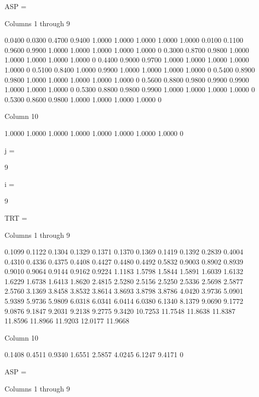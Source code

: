 ASP =

  Columns 1 through 9

    0.0400    0.0300    0.4700    0.9400    1.0000    1.0000    1.0000    1.0000    1.0000
    0.0100    0.1100    0.9600    0.9900    1.0000    1.0000    1.0000    1.0000    1.0000
         0    0.3000    0.8700    0.9800    1.0000    1.0000    1.0000    1.0000    1.0000
         0    0.4400    0.9000    0.9700    1.0000    1.0000    1.0000    1.0000    1.0000
         0    0.5100    0.8400    1.0000    0.9900    1.0000    1.0000    1.0000    1.0000
         0    0.5400    0.8900    0.9800    1.0000    1.0000    1.0000    1.0000    1.0000
         0    0.5600    0.8800    0.9800    0.9900    0.9900    1.0000    1.0000    1.0000
         0    0.5300    0.8800    0.9800    0.9900    1.0000    1.0000    1.0000    1.0000
         0    0.5300    0.8600    0.9800    1.0000    1.0000    1.0000    1.0000         0

  Column 10

    1.0000
    1.0000
    1.0000
    1.0000
    1.0000
    1.0000
    1.0000
    1.0000
         0


j =

     9


i =

     9


TRT =

  Columns 1 through 9

    0.1099    0.1122    0.1304    0.1329    0.1371    0.1370    0.1369    0.1419    0.1392
    0.2839    0.4004    0.4310    0.4336    0.4375    0.4408    0.4427    0.4480    0.4492
    0.5832    0.9003    0.8902    0.8939    0.9010    0.9064    0.9144    0.9162    0.9224
    1.1183    1.5798    1.5844    1.5891    1.6039    1.6132    1.6229    1.6738    1.6413
    1.8620    2.4815    2.5280    2.5156    2.5250    2.5336    2.5698    2.5877    2.5760
    3.1369    3.8458    3.8532    3.8614    3.8693    3.8798    3.8786    4.0420    3.9736
    5.0901    5.9389    5.9736    5.9809    6.0318    6.0341    6.0414    6.0380    6.1340
    8.1379    9.0690    9.1772    9.0876    9.1847    9.2031    9.2138    9.2775    9.3420
   10.7253   11.7548   11.8638   11.8387   11.8596   11.8966   11.9203   12.0177   11.9668

  Column 10

    0.1408
    0.4511
    0.9340
    1.6551
    2.5857
    4.0245
    6.1247
    9.4171
         0


ASP =

  Columns 1 through 9

